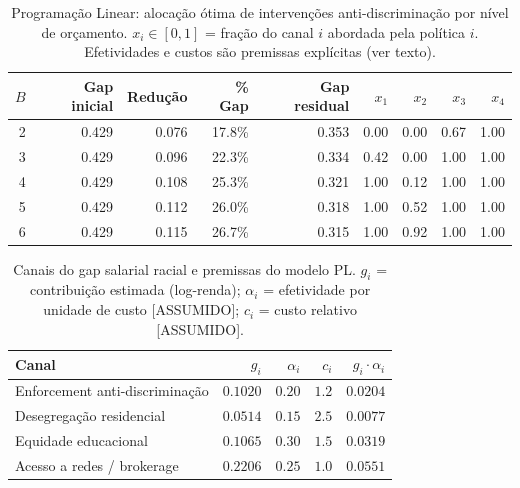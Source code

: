 \begin{table}[H]
  \centering
  \caption{Programação Linear: alocação ótima de intervenções anti-discriminação
           por nível de orçamento.
           $x_i \in [0,1]$ = fração do canal $i$ abordada pela política $i$.
           Efetividades e custos são premissas explícitas (ver texto).}
  \label{tab:po_pl}
  \small
  \begin{tabular}{rrrrrrrrr}
    \toprule
    $B$ & Gap inicial & Redução & \% Gap & Gap residual &
    $x_1$ & $x_2$ & $x_3$ & $x_4$ \\
    \midrule
  2 & 0.429 & 0.076 & 17.8\% & 0.353 & 0.00 & 0.00 & 0.67 & 1.00 \\
  3 & 0.429 & 0.096 & 22.3\% & 0.334 & 0.42 & 0.00 & 1.00 & 1.00 \\
  4 & 0.429 & 0.108 & 25.3\% & 0.321 & 1.00 & 0.12 & 1.00 & 1.00 \\
  5 & 0.429 & 0.112 & 26.0\% & 0.318 & 1.00 & 0.52 & 1.00 & 1.00 \\
  6 & 0.429 & 0.115 & 26.7\% & 0.315 & 1.00 & 0.92 & 1.00 & 1.00 \\
    \bottomrule
  \end{tabular}
\end{table}

\begin{table}[H]
  \centering
  \caption{Canais do gap salarial racial e premissas do modelo PL.
           $g_i$ = contribuição estimada (log-renda);
           $\alpha_i$ = efetividade por unidade de custo [ASSUMIDO];
           $c_i$ = custo relativo [ASSUMIDO].}
  \label{tab:po_canais}
  \small
  \begin{tabular}{lrrrr}
    \toprule
    Canal & $g_i$ & $\alpha_i$ & $c_i$ & $g_i \cdot \alpha_i$ \\
    \midrule
  Enforcement anti-discriminação & $0.1020$ & $0.20$ & $1.2$ & $0.0204$ \\
  Desegregação residencial & $0.0514$ & $0.15$ & $2.5$ & $0.0077$ \\
  Equidade educacional & $0.1065$ & $0.30$ & $1.5$ & $0.0319$ \\
  Acesso a redes / brokerage & $0.2206$ & $0.25$ & $1.0$ & $0.0551$ \\
    \bottomrule
  \end{tabular}
\end{table}
